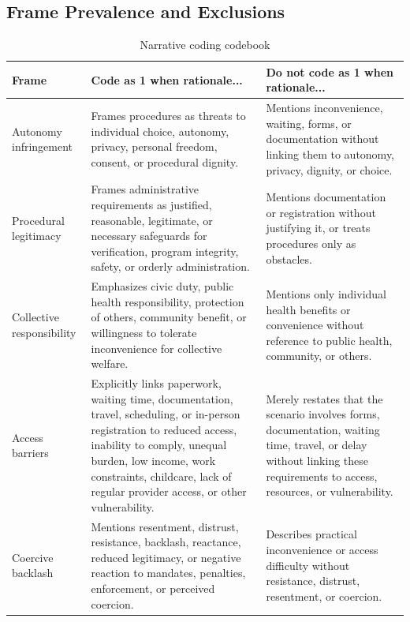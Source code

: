 \documentclass[11pt]{article}
\begin{document}
\subsection{Frame Prevalence and Exclusions}

\begin{table}[htbp]
\centering
\caption{Narrative coding codebook}
\label{tab:narrative-codebook}
\begin{tabular*}{\textwidth}{@{\extracolsep{\fill}}L{3.2cm}L{5.9cm}L{5.9cm}@{}}
\toprule
Frame & Code as 1 when rationale... & Do not code as 1 when rationale... \\
\midrule
Autonomy infringement &
Frames procedures as threats to individual choice, autonomy, privacy, personal freedom, consent, or procedural dignity. &
Mentions inconvenience, waiting, forms, or documentation without linking them to autonomy, privacy, dignity, or choice. \\

Procedural legitimacy &
Frames administrative requirements as justified, reasonable, legitimate, or necessary safeguards for verification, program integrity, safety, or orderly administration. &
Mentions documentation or registration without justifying it, or treats procedures only as obstacles. \\

Collective responsibility &
Emphasizes civic duty, public health responsibility, protection of others, community benefit, or willingness to tolerate inconvenience for collective welfare. &
Mentions only individual health benefits or convenience without reference to public health, community, or others. \\

Access barriers &
Explicitly links paperwork, waiting time, documentation, travel, scheduling, or in-person registration to reduced access, inability to comply, unequal burden, low income, work constraints, childcare, lack of regular provider access, or other vulnerability. &
Merely restates that the scenario involves forms, documentation, waiting time, travel, or delay without linking these requirements to access, resources, or vulnerability. \\

Coercive backlash &
Mentions resentment, distrust, resistance, backlash, reactance, reduced legitimacy, or negative reaction to mandates, penalties, enforcement, or perceived coercion. &
Describes practical inconvenience or access difficulty without resistance, distrust, resentment, or coercion. \\
\bottomrule
\end{tabular*}
\end{table}
\end{document}
